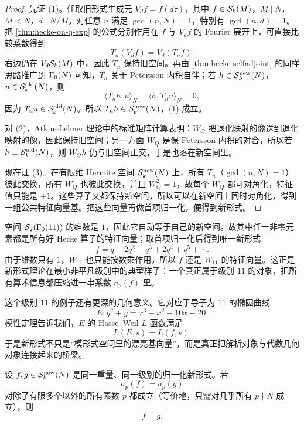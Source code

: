 \begin{proof}
先证 (1)。任取旧形式生成元 $V_df=f(d\tau)$，其中 $f\in \mathcal{S}_k(M)$，$M\mid N$，$M<N$，$d\mid N/M$。对任意 $n$ 满足 $\gcd(n,N)=1$，特别有 $\gcd(n,d)=1$。把 \cref{thm:hecke-on-q-exp} 的公式分别作用在 $f$ 与 $V_df$ 的 Fourier 展开上，可直接比较系数得到
\[
  T_n(V_df)=V_d(T_nf).
\]
右边仍在 $V_d\mathcal{S}_k(M)$ 中，因此 $T_n$ 保持旧空间。再由 \cref{thm:hecke-selfadjoint} 的同样思路推广到 $\Gamma_0(N)$ 可知，$T_n$ 关于 Petersson 内积自伴；若 $h\in \mathcal{S}_k^{\mathrm{new}}(N)$，$u\in \mathcal{S}_k^{\mathrm{old}}(N)$，则
\[
  \langle T_nh,u\rangle_N=\langle h,T_nu\rangle_N=0,
\]
因为 $T_nu\in \mathcal{S}_k^{\mathrm{old}}(N)$。所以 $T_nh\in \mathcal{S}_k^{\mathrm{new}}(N)$，(1) 成立。

对 (2)，Atkin--Lehner 理论中的标准矩阵计算表明：$W_Q$ 把退化映射的像送到退化映射的像，因此保持旧空间；另一方面 $W_Q$ 是保 Petersson 内积的对合，所以若 $h\perp \mathcal{S}_k^{\mathrm{old}}(N)$，则 $W_Qh$ 仍与旧空间正交，于是也落在新空间里。

现在证 (3)。在有限维 Hermite 空间 $\mathcal{S}_k^{\mathrm{new}}(N)$ 上，所有 $T_n$（$\gcd(n,N)=1$）彼此交换，所有 $W_Q$ 也彼此交换，并且 $W_Q^2=1$，故每个 $W_Q$ 都可对角化，特征值只能是 $\pm1$。这些算子又都保持新空间，所以可以在新空间上同时对角化，得到一组公共特征向量基。把这些向量再做首项归一化，便得到新形式。
\end{proof}

\begin{example}[级别 $11$ 的唯一新形式]
\label{ex:level11-newform}
空间 $\mathcal{S}_2(\Gamma_0(11))$ 的维数是 $1$，因此它自动等于自己的新空间。故其中任一非零元素都是所有好 Hecke 算子的特征向量；取首项归一化后得到唯一新形式
\[
  f=q-2q^2-q^3+2q^4+q^5+\cdots.
\]
由于维数只有 $1$，$W_{11}$ 也只能按数乘作用，所以 $f$ 还是 $W_{11}$ 的特征向量。这正是新形式理论在最小非平凡级别中的典型样子：一个真正属于级别 $11$ 的对象，把所有算术信息都压缩进一串系数 $a_p(f)$ 里。
\end{example}

这个级别 $11$ 的例子还有更深的几何意义。它对应于导子为 $11$ 的椭圆曲线
\[
  E\colon y^2+y=x^3-x^2-10x-20.
\]
模性定理告诉我们，$E$ 的 Hasse--Weil $L$-函数满足
\[
  L(E,s)=L(f,s).
\]
于是新形式不只是“模形式空间里的漂亮基向量”，而是真正把解析对象与代数几何对象连接起来的桥梁。

\begin{theorem}[强重数一定理]
\label{thm:strong-multiplicity-one}
设 $f,g\in \mathcal{S}_k^{\mathrm{new}}(N)$ 是同一重量、同一级别的归一化新形式。若
\[
  a_p(f)=a_p(g)
\]
对除了有限多个以外的所有素数 $p$ 都成立（等价地，只需对几乎所有 $p\nmid N$ 成立），则
\[
  f=g.
\]
\end{theorem}

